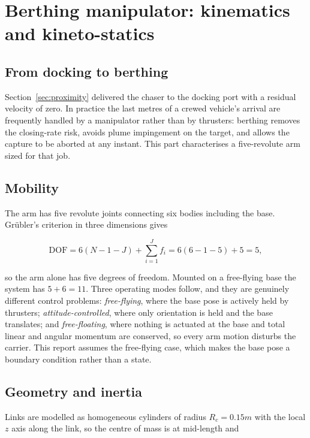\section{Berthing manipulator: kinematics and kineto-statics}
\label{sec:robotics}

\subsection{From docking to berthing}

Section~\ref{sec:proximity} delivered the chaser to the docking port with a
residual velocity of zero. In practice the last metres of a crewed vehicle's
arrival are frequently handled by a manipulator rather than by thrusters:
berthing removes the closing-rate risk, avoids plume impingement on the target,
and allows the capture to be aborted at any instant. This part characterises a
five-revolute arm sized for that job.

\subsection{Mobility}

The arm has five revolute joints connecting six bodies including the base.
Gr\"ubler's criterion in three dimensions gives

\begin{equation}
\text{DOF} = 6(N - 1 - J) + \sum_{i=1}^{J} f_i = 6(6-1-5) + 5 = 5,
\label{eq:grubler}
\end{equation}

so the arm alone has five degrees of freedom. Mounted on a free-flying base the
system has $5 + 6 = 11$. Three operating modes follow, and they are genuinely
different control problems: \emph{free-flying}, where the base pose is actively
held by thrusters; \emph{attitude-controlled}, where only orientation is held and
the base translates; and \emph{free-floating}, where nothing is actuated at the
base and total linear and angular momentum are conserved, so every arm motion
disturbs the carrier. This report assumes the free-flying case, which makes the
base pose a boundary condition rather than a state.

\subsection{Geometry and inertia}

Links are modelled as homogeneous cylinders of radius $R_c = 0.15\unit{m}$ with
the local $z$ axis along the link, so the centre of mass is at mid-length and

